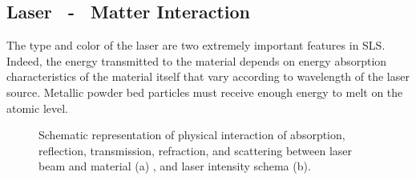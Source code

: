 \subsection{Laser ~- ~Matter Interaction}
\label{subsec:sintering}
The type and color of the laser are two extremely important features in SLS. Indeed, the energy transmitted to the material depends on energy absorption characteristics of the material itself that vary according to wavelength of the laser source. Metallic powder bed particles must receive enough energy to melt on the atomic level.
\begin{figure}
    \centering
    \qquad
    
    \caption[Laser interactions and laser intensity.]{Schematic representation of physical interaction of absorption, reflection, transmission, refraction, and scattering between laser beam and material (a) \cite{katayama_fundamentals_2020}, and laser intensity schema (b).}
\end{figure}
